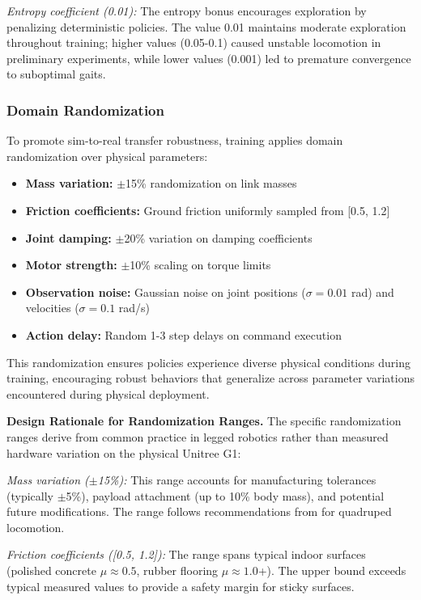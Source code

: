 \documentclass[12pt,a4paper]{article}
\begin{document}
\textit{Entropy coefficient (0.01):} The entropy bonus encourages exploration by penalizing deterministic policies. The value 0.01 maintains moderate exploration throughout training; higher values (0.05-0.1) caused unstable locomotion in preliminary experiments, while lower values (0.001) led to premature convergence to suboptimal gaits.

\subsubsection{Domain Randomization}

To promote sim-to-real transfer robustness, training applies domain randomization over physical parameters:

\begin{itemize}
    \item \textbf{Mass variation:} $\pm$15\% randomization on link masses
    \item \textbf{Friction coefficients:} Ground friction uniformly sampled from [0.5, 1.2]
    \item \textbf{Joint damping:} $\pm$20\% variation on damping coefficients
    \item \textbf{Motor strength:} $\pm$10\% scaling on torque limits
    \item \textbf{Observation noise:} Gaussian noise on joint positions ($\sigma = 0.01$ rad) and velocities ($\sigma = 0.1$ rad/s)
    \item \textbf{Action delay:} Random 1-3 step delays on command execution
\end{itemize}

This randomization ensures policies experience diverse physical conditions during training, encouraging robust behaviors that generalize across parameter variations encountered during physical deployment.

\textbf{Design Rationale for Randomization Ranges.} The specific randomization ranges derive from common practice in legged robotics rather than measured hardware variation on the physical Unitree G1:

\textit{Mass variation ($\pm$15\%):} This range accounts for manufacturing tolerances (typically $\pm$5\%), payload attachment (up to 10\% body mass), and potential future modifications. The range follows recommendations from \textcite{hwangbo2019learning} for quadruped locomotion.

\textit{Friction coefficients ([0.5, 1.2]):} The range spans typical indoor surfaces (polished concrete $\mu \approx 0.5$, rubber flooring $\mu \approx 1.0$+). The upper bound exceeds typical measured values to provide a safety margin for sticky surfaces.
\end{document}
